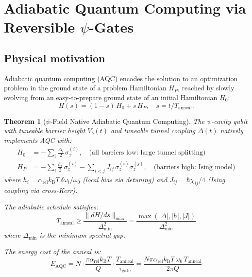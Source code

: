 \documentclass[11pt]{article}
\newtheorem{theorem}{Theorem}[section]
\theoremstyle{definition}
\theoremstyle{remark}
\newcommand{\kB}{k_{\mathrm{B}}}
\newcommand{\arel}{\alpha_{\mathrm{rel}}}
\begin{document}
\section{Adiabatic Quantum Computing via Reversible $\psi$-Gates}
\label{sec:adiabatic}

\subsection{Physical motivation}

Adiabatic quantum computing (AQC) encodes the solution to an optimization
problem in the ground state of a problem Hamiltonian $H_P$, reached by
slowly evolving from an easy-to-prepare ground state of an initial
Hamiltonian $H_0$:
\begin{equation}
H(s) = (1-s)\,H_0 + s\,H_P,\quad s = t/T_{\mathrm{anneal}}.
\end{equation}

\begin{theorem}[$\psi$-Field Native Adiabatic Quantum Computing]
\label{thm:adiabatic}
The $\psi$-cavity qubit with tuneable barrier height $V_b(t)$ and
tuneable tunnel coupling $\Delta(t)$ natively implements AQC with:
\begin{align}
H_0 &= -\sum_i \frac{\Delta_i}{2}\,\sigma_x^{(i)},
\quad\text{(all barriers low: large tunnel splitting)} \\
H_P &= -\sum_i \frac{h_i}{2}\,\sigma_z^{(i)}
- \sum_{i<j} J_{ij}\,\sigma_z^{(i)}\sigma_z^{(j)},
\quad\text{(barriers high: Ising model)}
\end{align}
where $h_i = \arel\kB T\,\delta\omega_i/\omega_0$ (local bias via
detuning) and $J_{ij} = \hbar\chi_{ij}/4$ (Ising coupling via
cross-Kerr).

The adiabatic schedule satisfies:
\begin{equation}
\boxed{
T_{\mathrm{anneal}} \geq \frac{\|dH/ds\|_{\max}}{\Delta_{\min}^2}
= \frac{\max(|\Delta|, |h|, |J|)}{\Delta_{\min}^2}
}
\label{eq:adiabatic-time}
\end{equation}
where $\Delta_{\min}$ is the minimum spectral gap.

The energy cost of the anneal is:
\begin{equation}
\boxed{
E_{\mathrm{AQC}} = N\cdot\frac{\pi\arel\kB T}{Q}\cdot\frac{T_{\mathrm{anneal}}}{\tau_{\mathrm{gate}}}
= \frac{N\pi\arel\kB T\,\omega_0\,T_{\mathrm{anneal}}}{2\pi Q}
}
\label{eq:adiabatic-energy}
\end{equation}
\end{theorem}
\end{document}
